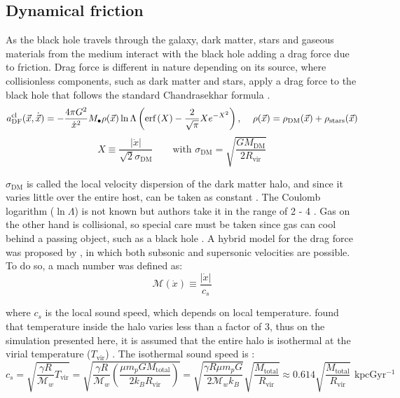 		\subsection{Dynamical friction}
			As the black hole travels through the galaxy, dark matter, stars and gaseous materials from the medium interact with the black hole adding a drag force due to friction. Drag force is different in nature depending on its source, where collisionless components, such as dark matter and stars, apply a drag force to the black hole that follows the standard Chandrasekhar formula \cite{binney2011galactic, madau2004effect, tanaka2009assembly, choksi2017recoiling}.
			\begin{equation}\label{eq: df_cl}
				a_\text{DF}^\text{cl}(\vec{x}, \dot{\vec{x}}) = -\dfrac{4\pi G^2}{\dot{x}^2} M_\bullet\rho(\vec{x})\ln\Lambda\left(\text{erf}\left(X\right) - \dfrac{2}{\sqrt{\pi}}Xe^{-X^2}\right)\text{, } \quad \rho(\vec{x}) = \rho_\text{DM}(\vec{x}) + \rho_\text{stars}(\vec{x})
			\end{equation}
			\begin{equation}
				X \equiv \dfrac{|\dot{x}|}{\sqrt{2}\sigma_\text{DM}} \qquad \text{with } \sigma_\text{DM} = \sqrt{\dfrac{GM_\text{DM}}{2R_\text{vir}}}
			\end{equation}
			
			$\sigma_\text{DM}$ is called the local velocity dispersion of the dark matter halo, and since it varies little over the entire host, can be taken as constant \cite{tanaka2009assembly, choksi2017recoiling}. The Coulomb logarithm ($\ln\Lambda$) is not known but authors take it in the range of 2 - 4 \cite{choksi2017recoiling}. Gas on the other hand is collisional, so special care must be taken since gas can cool behind a passing object, such as a black hole \cite{choksi2017recoiling}. A hybrid model for the drag force was proposed by \citeauthor{tanaka2009assembly}, in which both subsonic and supersonic velocities are possible. To do so, a mach number was defined as:
			\begin{equation}
				\mathcal{M}(\dot{x}) \equiv \dfrac{|\dot{x}|}{c_s}
			\end{equation}
			
			where $c_s$ is the local sound speed, which depends on local temperature. \citeauthor{tanaka2009assembly} found that temperature inside the halo varies less than a factor of 3, thus on the simulation presented here, it is assumed that the entire halo is isothermal at the virial temperature ($T_\text{vir}$) \cite{choksi2017recoiling}. The isothermal sound speed is \cite{barkana2001beginning}:
			\begin{equation}\label{eq: soundSpeed}
				c_s = \sqrt{\dfrac{\gamma R}{\mathcal{M}_w}T_\text{vir}} = \sqrt{\dfrac{\gamma R}{\mathcal{M}_w}\left(\dfrac{\mu m_p G M_\text{total}}{2k_BR_\text{vir}}\right)} = \sqrt{\dfrac{\gamma R\mu m_pG}{2\mathcal{M}_wk_B}} \sqrt{\dfrac{M_\text{total}}{R_\text{vir}}} \approx 0.614 \sqrt{\dfrac{M_\text{total}}{R_\text{vir}}}\text{ kpcGyr$^{-1}$}
			\end{equation}
			
